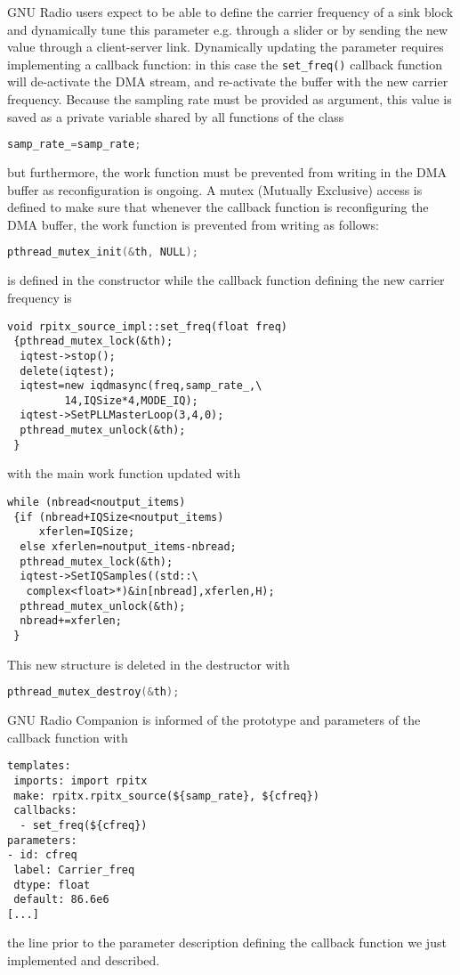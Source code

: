 \documentclass{article}
\begin{document}
GNU Radio users expect to be able to define the carrier frequency of
a sink block and dynamically tune this parameter e.g. through a slider
or by sending the new value through a client-server link. Dynamically
updating the parameter requires implementing a callback function: in this
case the {\tt set\_freq()} callback function will de-activate the DMA
stream, and re-activate the buffer with the new carrier frequency. Because
the sampling rate must be provided as argument, this value is saved as a 
private variable shared by all functions of the class
\begin{lstlisting}[language=C]
samp_rate_=samp_rate;
\end{lstlisting}
but furthermore, the work function must be prevented from writing in the DMA
buffer as reconfiguration is ongoing. A mutex (Mutually Exclusive) access is defined
to make sure that whenever the callback function is reconfiguring the DMA buffer,
the work function is prevented from writing as follows:
\begin{lstlisting}[language=C]
pthread_mutex_init(&th, NULL);
\end{lstlisting}
is defined in the constructor while the callback function defining the new carrier
frequency is
\begin{lstlisting}
void rpitx_source_impl::set_freq(float freq)
 {pthread_mutex_lock(&th);
  iqtest->stop();
  delete(iqtest);
  iqtest=new iqdmasync(freq,samp_rate_,\
         14,IQSize*4,MODE_IQ);
  iqtest->SetPLLMasterLoop(3,4,0);
  pthread_mutex_unlock(&th);
 }
\end{lstlisting}

with the main work function updated with
\begin{lstlisting}
while (nbread<noutput_items)
 {if (nbread+IQSize<noutput_items) 
     xferlen=IQSize; 
  else xferlen=noutput_items-nbread;
  pthread_mutex_lock(&th);
  iqtest->SetIQSamples((std::\
   complex<float>*)&in[nbread],xferlen,H);
  pthread_mutex_unlock(&th);
  nbread+=xferlen;
 }
\end{lstlisting}

This new structure is deleted in the destructor with
\begin{lstlisting}[language=C]
pthread_mutex_destroy(&th);
\end{lstlisting}

GNU Radio Companion is informed of the prototype and parameters of the callback function
with 
\begin{verbatim}
templates:
 imports: import rpitx
 make: rpitx.rpitx_source(${samp_rate}, ${cfreq})
 callbacks:
  - set_freq(${cfreq})
parameters:
- id: cfreq
 label: Carrier_freq
 dtype: float
 default: 86.6e6
[...]
\end{verbatim}
the line prior to the parameter description defining the callback function we 
just implemented and described.
\end{document}
